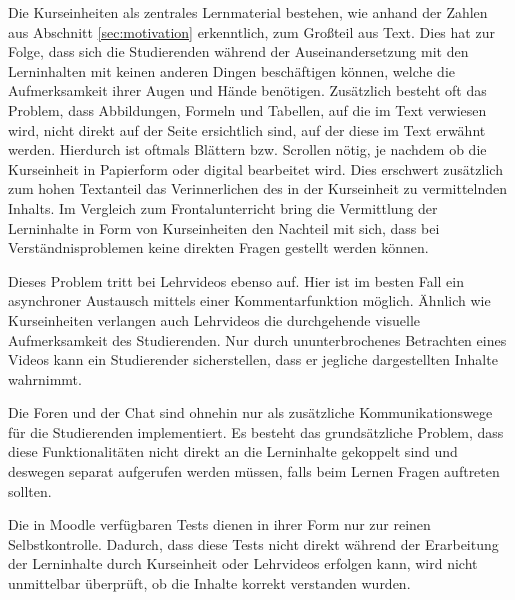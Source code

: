 Die Kurseinheiten als zentrales Lernmaterial bestehen, wie anhand der Zahlen aus Abschnitt \ref{sec:motivation} erkenntlich, zum Großteil aus Text. Dies hat zur Folge, dass sich die Studierenden während der Auseinandersetzung mit den Lerninhalten mit keinen anderen Dingen beschäftigen können, welche die Aufmerksamkeit ihrer Augen und Hände benötigen. Zusätzlich besteht oft das Problem, dass Abbildungen, Formeln und Tabellen, auf die im Text verwiesen wird, nicht direkt auf der Seite ersichtlich sind, auf der diese im Text erwähnt werden. Hierdurch ist oftmals Blättern bzw. Scrollen nötig, je nachdem ob die Kurseinheit in Papierform oder digital bearbeitet wird. Dies erschwert zusätzlich zum hohen Textanteil das Verinnerlichen des in der Kurseinheit zu vermittelnden Inhalts. Im Vergleich zum Frontalunterricht bring die Vermittlung der Lerninhalte in Form von Kurseinheiten den Nachteil mit sich, dass bei Verständnisproblemen keine direkten Fragen gestellt werden können.

Dieses Problem tritt bei Lehrvideos ebenso auf. Hier ist im besten Fall ein asynchroner Austausch mittels einer Kommentarfunktion möglich. Ähnlich wie Kurseinheiten verlangen auch Lehrvideos die durchgehende visuelle Aufmerksamkeit des Studierenden. Nur durch ununterbrochenes Betrachten eines Videos kann ein Studierender sicherstellen, dass er jegliche dargestellten Inhalte wahrnimmt.


Die Foren und der Chat sind ohnehin nur als zusätzliche Kommunikationswege für die Studierenden implementiert. Es besteht das grundsätzliche Problem, dass diese Funktionalitäten nicht direkt an die Lerninhalte gekoppelt sind und deswegen separat aufgerufen werden müssen, falls beim Lernen Fragen auftreten sollten. 

Die in Moodle verfügbaren Tests dienen in ihrer Form nur zur reinen Selbstkontrolle. Dadurch, dass diese Tests nicht direkt während der Erarbeitung der Lerninhalte durch Kurseinheit oder Lehrvideos erfolgen kann, wird nicht unmittelbar überprüft, ob die Inhalte korrekt verstanden wurden.


